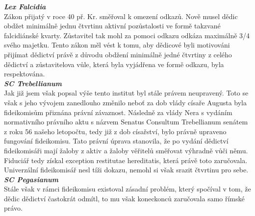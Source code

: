 \documentclass{article}
\begin{document}
\noindent\textbf{\textit{Lex Falcidia}}\\

Zákon přijatý v roce 40 př. Kr. směřoval k omezení odkazů. Nově musel dědic obdžet minimálně jednu čtvrtinu aktivní pozůstalosti ve formě takzvané falcidiánské kvarty. Zůstavitel tak mohl za pomoci odkazu odkáza maximálně 3/4 svého majetku. Tento zákon měl vést k tomu, aby dědicové byli motivováni přijímat dědictví právě z důvodu obdžení minimálně jedné čtvrtiny z celého dědictví a zůstavitelova vůle, která byla vyjádřena ve formě odkazu, byla respektována.\\

\noindent\textbf{\textit{SC Trebellianum}}\\

Jak již jsem však popsal výše tento institut byl stále právem neupravený. Toto se však s jeho vývojem zanedlouho změnilo neboť za dob vlády císaře Augusta byla fideikomisům přiznána právní závaznost. Následně za vlády Nera s vydáním normativního právního aktu s názvem Senatus Consultum Trebe\-llianum senátem z roku 56 našeho letopočtu, tedy již z dob císařství, bylo právně upraveno fungování fideikomisu. Tato právní úprava stanovila, že po vydání dědictví fideikomisáři mají žaloby z aktiv a žaloby věřitelů směřovat výhradně vůči němu. Fiduciář tedy získal exception restitutae hereditatis, která právě toto zaručovala. Univerzální fideikomisář nesl tíži dokazu, nemohl si však srazit čtvrtinu pro sebe.\\ 

\noindent\textbf{\textit{SC Pegasianum}}\\


Stále však v rámci fideikomisu existoval zásadní problém, který spočíval v tom, že dědic dědictví častokrát odmítl, to mu však koneckonců zaručovala samo římské právo.\\ 
\end{document}
